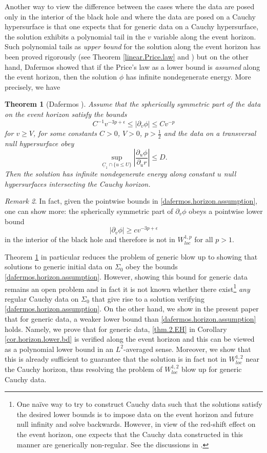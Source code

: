 \documentclass[12 pt, reqno]{amsart}
\newtheorem{theorem}{Theorem}[section]
\theoremstyle{definition}
\theoremstyle{remark}
\newtheorem{remark}[theorem]{Remark}
\numberwithin{equation}{section}
\newcommand{\ep}{\epsilon}
\newcommand{\rd}{\partial}
\newcommand{\0}{\emptyset}
\newcommand{\f}{\frac}
\begin{document}
Another way to view the difference between the cases where the data are posed only in the interior of the black hole and where the data are posed on a Cauchy hypersurface is that one expects that for generic data on a Cauchy hypersurface, the solution exhibits a polynomial tail in the $v$ variable along the event horizon. Such polynomial tails as \emph{upper bound} for the solution along the event horizon has been proved rigorously (see Theorem \ref{linear.Price.law} and \cite{DRPL}) but on the other hand, Dafermos showed that if the Price's law as a lower bound is \emph{assumed} along the event horizon, then the solution $\phi$ has infinite nondegenerate energy. More precisely, we have
\begin{theorem}[Dafermos \cite{D2}]\label{Dafermos.thm}
Assume that the spherically symmetric part of the data on the event horizon satisfy the bounds
\begin{equation}\label{dafermos.horizon.assumption}
C^{-1}v^{-3p+\ep}\leq |\rd_v \phi|\leq Cv^{-p}
\end{equation}
for $v\geq V$, for some constants $C>0$, $V>0$, $p>\f 12$ and the data on a transversal null hypersurface obey
$$\sup_{\underline C_1\cap \{u\leq U\}}|\f{\rd_u\phi}{\rd_u r}|\leq D.$$
Then the solution has infinite nondegenerate energy along constant $u$ null hypersurfaces intersecting the Cauchy horizon.
\end{theorem}
\begin{remark}
In fact, given the pointwise bounds in \eqref{dafermos.horizon.assumption}, one can show more: the spherically symmetric part of $\rd_v\phi$ obeys a pointwise lower bound
$$|\rd_v\phi|\geq c v^{-3p+\ep}$$
in the interior of the black hole and therefore is not in $W^{1,p}_{loc}$ for all $p>1$.
\end{remark}
Theorem \ref{Dafermos.thm} in particular reduces the problem of generic blow up to showing that solutions to generic initial data on $\Sigma_0$ obey the bounds \eqref{dafermos.horizon.assumption}. However, showing this bound for generic data remains an open problem and in fact it is not known whether there exist\footnote{One na\"{i}ve way to try to construct Cauchy data such that the solutions satisfy the desired lower bounds is to impose data on the event horizon and future null infinity and solve backwards. However, in view of the red-shift effect on the event horizon, one expects that the Cauchy data constructed in this manner are generically non-regular. See the discussions in \cite{DRSRS}.} \emph{any} regular Cauchy data on $\Sigma_0$ that give rise to a solution verifying \eqref{dafermos.horizon.assumption}. On the other hand, we show in the present paper that for generic data, a weaker lower bound than \eqref{dafermos.horizon.assumption} holds. Namely, we prove that for generic data, \eqref{thm.2.EH} in Corollary \ref{cor.horizon.lower.bd} is verified along the event horizon and this can be viewed as a polynomial lower bound in an $L^2$-averaged sense. Moreover, we show that this is already sufficient to guarantee that the solution is in fact not in $W^{1,2}_{loc}$ near the Cauchy horizon, thus resolving the problem of $W^{1,2}_{loc}$ blow up for generic Cauchy data.
\end{document}
